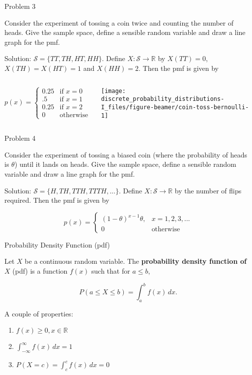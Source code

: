 \documentclass[ignorenonframetext,aspectratio=169]{beamer}
\providecommand{\tightlist}{%
  \setlength{\itemsep}{0pt}\setlength{\parskip}{0pt}}
\begin{document}
\begin{frame}{Problem 3}
\protect\hypertarget{problem-3}{}

Consider the experiment of tossing a coin twice and counting the number
of heads. Give the sample space, define a sensible random variable and
draw a line graph for the pmf.

Solution: \(\mathcal{S}=\{TT, TH, HT, HH\}\). Define
\(X:\mathcal{S}\rightarrow\mathbb{R}\) by \(X(TT)=0\), \(X(TH)=X(HT)=1\)
and \(X(HH)=2\). Then the pmf is given by

\begin{columns}[T,onlytextwidth]
\[p(x) = 
  \begin{cases} 
    0.25 & \text{if  } x=0 \\ 
    .5 & \text{if  } x=1 \\
    0.25 & \text{if  } x=2 \\ 
    0 & \text{otherwise}
  \end{cases}
\]

\texttt{[image: discrete\_probability\_distributions-I\_files/figure-beamer/coin-toss-bernoulli-1]} 
\end{columns}

\end{frame}

\begin{frame}{Problem 4}
\protect\hypertarget{problem-4}{}

Consider the experiment of tossing a biased coin (where the probability
of heads is \(\theta\)) until it lands on heads. Give the sample space,
define a sensible random variable and draw a line graph for the pmf.

Solution: \(\mathcal{S}=\{H, TH, TTH, TTTH, ...\}\). Define
\(X:\mathcal{S}\rightarrow\mathbb{R}\) by the number of flips required.
Then the pmf is given by

\[p(x) = 
  \begin{cases} 
    (1-\theta)^{x-1}\theta, & x=1,2,3,... \\ 
    0 & \text{otherwise}
  \end{cases}
\]

\end{frame}

\begin{frame}{Probability Density Function (pdf)}
\protect\hypertarget{probability-density-function-pdf}{}

Let \(X\) be a continuous random variable. The \textbf{probability
density function of \(X\)} (pdf) is a function \(f(x)\) such that for
\(a\leq b\),

\[P(a\leq X\leq b)=\int_a^b f(x)\,dx.\]

A couple of properties:

\begin{enumerate}
\tightlist
\item
  \(f(x)\geq 0, x\in\mathbb R\)
\item
  \(\int_{-\infty}^{\infty}f(x)\,dx=1\)
\item
  \(P(X=c)=\int_c^c f(x)\,dx=0\)
\end{enumerate}

\end{frame}
\end{document}
